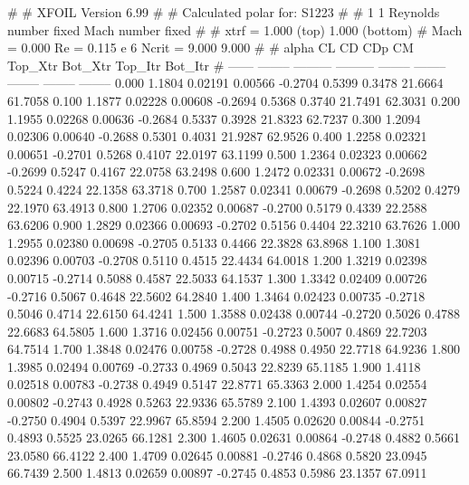 #  
#       XFOIL         Version 6.99
#  
# Calculated polar for: S1223                                           
#  
# 1 1 Reynolds number fixed          Mach number fixed         
#  
# xtrf =   1.000 (top)        1.000 (bottom)  
# Mach =   0.000     Re =     0.115 e 6     Ncrit =   9.000  9.000
#  
#   alpha    CL        CD       CDp       CM     Top_Xtr  Bot_Xtr  Top_Itr  Bot_Itr
#  ------ -------- --------- --------- -------- -------- -------- -------- --------
   0.000   1.1804   0.02191   0.00566  -0.2704   0.5399   0.3478  21.6664  61.7058
   0.100   1.1877   0.02228   0.00608  -0.2694   0.5368   0.3740  21.7491  62.3031
   0.200   1.1955   0.02268   0.00636  -0.2684   0.5337   0.3928  21.8323  62.7237
   0.300   1.2094   0.02306   0.00640  -0.2688   0.5301   0.4031  21.9287  62.9526
   0.400   1.2258   0.02321   0.00651  -0.2701   0.5268   0.4107  22.0197  63.1199
   0.500   1.2364   0.02323   0.00662  -0.2699   0.5247   0.4167  22.0758  63.2498
   0.600   1.2472   0.02331   0.00672  -0.2698   0.5224   0.4224  22.1358  63.3718
   0.700   1.2587   0.02341   0.00679  -0.2698   0.5202   0.4279  22.1970  63.4913
   0.800   1.2706   0.02352   0.00687  -0.2700   0.5179   0.4339  22.2588  63.6206
   0.900   1.2829   0.02366   0.00693  -0.2702   0.5156   0.4404  22.3210  63.7626
   1.000   1.2955   0.02380   0.00698  -0.2705   0.5133   0.4466  22.3828  63.8968
   1.100   1.3081   0.02396   0.00703  -0.2708   0.5110   0.4515  22.4434  64.0018
   1.200   1.3219   0.02398   0.00715  -0.2714   0.5088   0.4587  22.5033  64.1537
   1.300   1.3342   0.02409   0.00726  -0.2716   0.5067   0.4648  22.5602  64.2840
   1.400   1.3464   0.02423   0.00735  -0.2718   0.5046   0.4714  22.6150  64.4241
   1.500   1.3588   0.02438   0.00744  -0.2720   0.5026   0.4788  22.6683  64.5805
   1.600   1.3716   0.02456   0.00751  -0.2723   0.5007   0.4869  22.7203  64.7514
   1.700   1.3848   0.02476   0.00758  -0.2728   0.4988   0.4950  22.7718  64.9236
   1.800   1.3985   0.02494   0.00769  -0.2733   0.4969   0.5043  22.8239  65.1185
   1.900   1.4118   0.02518   0.00783  -0.2738   0.4949   0.5147  22.8771  65.3363
   2.000   1.4254   0.02554   0.00802  -0.2743   0.4928   0.5263  22.9336  65.5789
   2.100   1.4393   0.02607   0.00827  -0.2750   0.4904   0.5397  22.9967  65.8594
   2.200   1.4505   0.02620   0.00844  -0.2751   0.4893   0.5525  23.0265  66.1281
   2.300   1.4605   0.02631   0.00864  -0.2748   0.4882   0.5661  23.0580  66.4122
   2.400   1.4709   0.02645   0.00881  -0.2746   0.4868   0.5820  23.0945  66.7439
   2.500   1.4813   0.02659   0.00897  -0.2745   0.4853   0.5986  23.1357  67.0911
